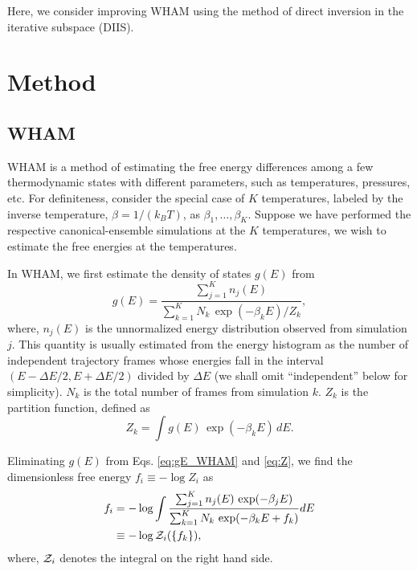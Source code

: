 \documentclass[reprint,superscriptaddress]{revtex4-1}
\begin{document}
Here, we consider improving WHAM using
the method of direct inversion in the iterative subspace (DIIS)\cite{
pulay1980, *pulay1982, *hamilton1986,
kovalenko1999, howard2011}.
%





\section{Method}





\subsection{WHAM}



WHAM is a method of
estimating the free energy differences
among a few thermodynamic states
with different parameters,
such as temperatures, pressures, etc.
%
For definiteness,
consider the special case of $K$ temperatures,
labeled by the inverse temperature,
$\beta = 1/(k_B T)$,
as
$\beta_1, \ldots, \beta_K$.
%
Suppose we have performed the respective
canonical-ensemble simulations
at the $K$ temperatures,
we wish to estimate the free energies
at the temperatures.



In WHAM,
we first estimate the density of states $g(E)$ from
%
\begin{equation}
g(E)
=
\frac{
  \sum_{j = 1}^K n_j(E)
}
{
  \sum_{k = 1}^K N_k \, \exp(-\beta_k E) / Z_k
},
\label{eq:gE_WHAM}
\end{equation}
%
where,
$n_j(E)$
is the unnormalized energy distribution
observed from simulation $j$.
%
This quantity is usually estimated
from the energy histogram as
the number of independent trajectory frames
whose energies fall in the interval
$(E - \Delta E/2, E + \Delta E/2)$
divided by $\Delta E$
(we shall omit ``independent'' below for simplicity).
%
$N_k$
is the total number of frames
from simulation $k$.
%
$Z_k$
is the partition function,
defined as
%
\begin{equation}
Z_k
=
\int g(E) \, \exp(-\beta_k E) \, dE.
\label{eq:Z}
\end{equation}




Eliminating $g(E)$
from Eqs. \eqref{eq:gE_WHAM} and \eqref{eq:Z},
we find the dimensionless free energy
$f_i \equiv -\log Z_i$
as
\begin{align}
f_i
&=
-\log
  \int
    \frac{
      \sum_{j = 1}^K n_j(E) \, \exp(-\beta_j E)
    }
    {
      \sum_{k = 1}^K N_k \, \exp(-\beta_k E + f_k)
    }
    dE
\label{eq:f_WHAM}
\\
&\equiv
-\log \mathcal{Z}_i(\{ f_k \}),
\notag
\end{align}
%
where,
$\mathcal{Z}_i$
denotes the integral on the right hand side.
\end{document}
